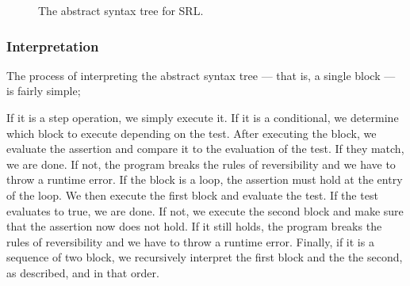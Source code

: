 \begin{figure}[H]
  
  \caption{The abstract syntax tree for SRL.}\label{fig:srlast}
\end{figure}


\subsubsection{Interpretation}

The process of interpreting the abstract syntax tree --- that is, a single block --- is fairly simple;

If it is a step operation, we simply execute it.
If it is a conditional, we determine which block to execute depending on the test. After executing the block, we evaluate the assertion and compare it to the evaluation of the test. If they match, we are done. If not, the program breaks the rules of reversibility and we have to throw a runtime error.
If the block is a loop, the assertion must hold at the entry of the loop. We then execute the first block and evaluate the test. If the test evaluates to true, we are done. If not, we execute the second block and make sure that the assertion now does not hold. If it still holds, the program breaks the rules of reversibility and we have to throw a runtime error. Finally, if it is a sequence of two block, we recursively interpret the first block and the the second, as described, and in that order.
